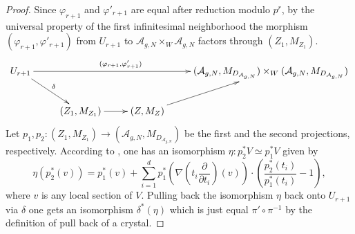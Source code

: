 \documentclass[12pt,twoside]{book}
\theoremstyle{plain}
\theoremstyle{definition}
\theoremstyle{remark}
\numberwithin{equation}{section}
\begin{document}
\begin{proof}
Since $\varphi_{r+1}$ and $\varphi'_{r+1}$ are equal after reduction modulo $p^r$, by the universal property of the first infinitesimal neighborhood the morphism $(\varphi_{r+1},\varphi'_{r+1})$ from $U_{r+1}$ to ${\mathcal A_{g,N}} \times_W {\mathcal A_{g,N}}$ factors through $(Z_1,M_{Z_1})$.
\begin{equation*}
\xymatrix{U_{r+1} \ar[rrr]^(0.4){(\varphi_{r+1},\varphi'_{r+1})} \ar[dr]^{\delta} & & & ({\mathcal A_{g,N}},M_{D_{{\mathcal A_{g,N}}}})\times_W ({\mathcal A_{g,N}},M_{D_{{\mathcal A_{g,N}}}})\\
& (Z_1,M_{Z_1}) \ar[r] & (Z,M_Z) \ar[ur] & \\}
\end{equation*}
Let $p_1,p_2\colon (Z_1,M_{Z_1}) \rightarrow ({\mathcal A_{g,N}},M_{D_{{\mathcal A_{g,N}}}})$ be the first and the second projections, respectively. According to \cite[6.7]{Kat89}, one has an isomorphism $\eta: p_2^* V\simeq p_1^* V$ given by
\begin{equation} \label{eq_Taylor_Conn}
\eta(p_2^*(v)) = p_1^*(v) + \sum_{i=1}^{d} p_1^*\left(\nabla\left(t_i\frac{\partial}{\partial t_i}\right)(v)\right)\cdot \left(\frac{p_2^*(t_i)}{p_1^*(t_i)}-1\right),
\end{equation}
where $v$ is any local section of $V$. Pulling back the isomorphism $\eta$ back onto $U_{r+1}$ via $\delta$ one gets an isomorphism $\delta^*(\eta)$ which is just equal $\pi'\circ\pi^{-1}$ by the definition of pull back of a crystal.


\end{proof}
\end{document}
